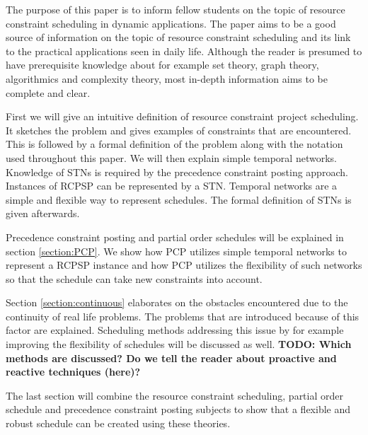 \documentclass{article}
\newcommand{\TODO}[1]{{\color{red}\textbf{TODO: #1}}}
\begin{document}
The purpose of this paper is to inform fellow students on the topic of resource constraint scheduling in dynamic applications.
The paper aims to be a good source of information on the topic of resource constraint scheduling and its link to the practical applications seen in daily life.
Although the reader is presumed to have prerequisite knowledge about for example set theory, graph theory, algorithmics and complexity theory, most in-depth information aims to be complete and clear.

First we will give an intuitive definition of resource constraint project scheduling. 
It sketches the problem and gives examples of constraints that are encountered. 
This is followed by a formal definition of the problem along with the notation used throughout this paper. 
We will then explain simple temporal networks. 
Knowledge of STNs is required by the precedence constraint posting approach. Instances of RCPSP can be represented by a STN. 
Temporal networks are a simple and flexible way to represent schedules.
The formal definition of STNs is given afterwards. 


Precedence constraint posting and partial order schedules will be explained in section \ref{section:PCP}. 
We show how PCP utilizes simple temporal networks to represent a RCPSP instance and how PCP utilizes the flexibility of such networks so that the schedule can take new constraints into account. 

Section \ref{section:continuous} elaborates on the obstacles encountered due to the continuity of real life problems. 
The problems that are introduced because of this factor are explained. 
Scheduling methods addressing this issue by for example improving the flexibility of schedules will be discussed as well. 
\TODO{Which methods are discussed? Do we tell the reader about proactive and reactive techniques (here)?}

The last section will combine the resource constraint scheduling, partial order schedule and precedence constraint posting subjects to show that a flexible and robust schedule can be created using these theories. 
\end{document}
